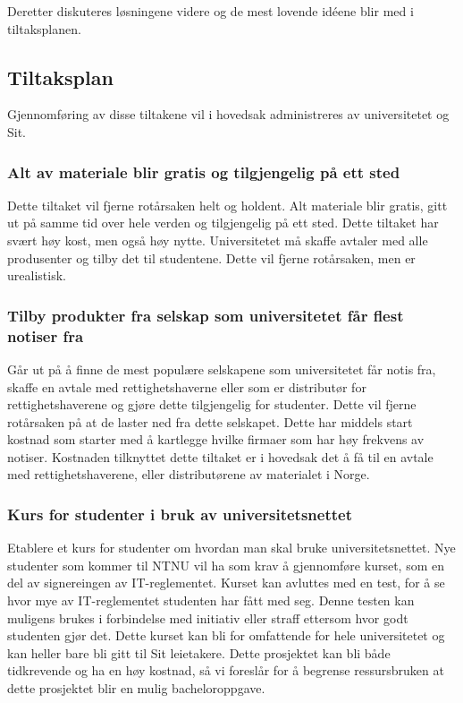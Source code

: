 Deretter diskuteres løsningene videre og de mest lovende idéene blir med i tiltaksplanen.

\subsection{Tiltaksplan}
Gjennomføring av disse tiltakene vil i hovedsak administreres av universitetet og Sit.

\subsubsection{Alt av materiale blir gratis og tilgjengelig på ett sted}
Dette tiltaket vil fjerne rotårsaken helt og holdent. Alt materiale blir gratis, gitt ut på samme tid over hele verden og tilgjengelig på ett sted. Dette tiltaket har svært høy kost, men også høy nytte. Universitetet må skaffe avtaler med alle produsenter og tilby det til studentene. Dette vil fjerne rotårsaken, men er urealistisk. 

\subsubsection{Tilby produkter fra selskap som universitetet får flest notiser fra}
Går ut på å finne de mest populære selskapene som universitetet får notis fra, skaffe en avtale med rettighetshaverne eller som er distributør for rettighetshaverene og gjøre dette tilgjengelig for studenter. Dette vil fjerne rotårsaken på at de laster ned fra dette selskapet. Dette har middels start kostnad som starter med å kartlegge hvilke firmaer som har høy frekvens av notiser. Kostnaden tilknyttet dette tiltaket er i hovedsak det å få til en avtale med rettighetshaverene, eller distributørene av materialet i Norge.

\subsubsection{Kurs for studenter i bruk av universitetsnettet}
Etablere et kurs for studenter om hvordan man skal bruke universitetsnettet. Nye studenter som kommer til NTNU vil ha som krav å gjennomføre kurset, som en del av signereingen av IT-reglementet. Kurset kan avluttes med en test, for å se hvor mye av IT-reglementet studenten har fått med seg. Denne testen kan muligens brukes i forbindelse med initiativ eller straff ettersom hvor godt studenten gjør det. Dette kurset kan bli for omfattende for hele universitetet og kan heller bare bli gitt til Sit leietakere. Dette prosjektet kan bli både tidkrevende og ha en høy kostnad, så vi foreslår for å begrense ressursbruken at dette prosjektet blir en mulig bacheloroppgave. 

